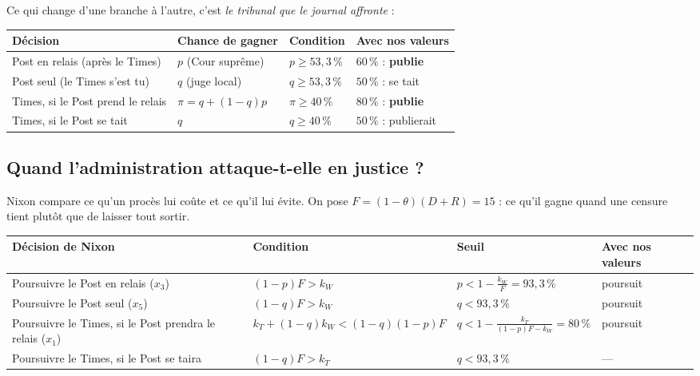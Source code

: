 \documentclass[11pt,a4paper]{article}
\theoremstyle{definition}
\newcommand{\T}[1]{\textcolor{nyt}{#1}}
\newcommand{\W}[1]{\textcolor{wp}{#1}}
\begin{document}
Ce qui change d'une branche à l'autre, c'est \emph{le tribunal que le journal affronte} :
\begin{center}
\small
\begin{tabular}{@{}llll@{}}
\toprule
Décision & Chance de gagner & Condition & Avec nos valeurs \\
\midrule
\W{Post} en relais (après le Times) & $p$ (Cour suprême) & $p\ge53{,}3\,\%$ & $60\,\%$ : \textbf{publie} \\
\W{Post} seul (le Times s'est tu) & $q$ (juge local) & $q\ge53{,}3\,\%$ & $50\,\%$ : se tait \\
\T{Times}, si le Post prend le relais & $\pi=q+(1-q)p$ & $\pi\ge40\,\%$ & $80\,\%$ : \textbf{publie} \\
\T{Times}, si le Post se tait & $q$ & $q\ge40\,\%$ & $50\,\%$ : publierait \\
\bottomrule
\end{tabular}
\end{center}

\subsection{Quand l'administration attaque-t-elle en justice ?}
Nixon compare ce qu'un procès lui coûte et ce qu'il lui évite. On pose $F=(1-\theta)(D+R)=15$ : ce qu'il gagne quand une censure tient plutôt que de laisser tout sortir.
\begin{center}
\small
\begin{tabularx}{\textwidth}{@{}>{\raggedright\arraybackslash}p{3.6cm}>{\raggedright\arraybackslash}Xll@{}}
\toprule
Décision de Nixon & Condition & Seuil & Avec nos valeurs \\
\midrule
Poursuivre le Post en relais ($x_3$) & $(1-p)F>k_W$ & $p<1-\frac{k_W}{F}=93{,}3\,\%$ & poursuit \\
Poursuivre le Post seul ($x_5$) & $(1-q)F>k_W$ & $q<93{,}3\,\%$ & poursuit \\
Poursuivre le Times, si le Post prendra le relais ($x_1$) & $k_T+(1-q)k_W<(1-q)(1-p)F$ & $q<1-\frac{k_T}{(1-p)F-k_W}=80\,\%$ & poursuit \\
Poursuivre le Times, si le Post se taira & $(1-q)F>k_T$ & $q<93{,}3\,\%$ & --- \\
\bottomrule
\end{tabularx}
\end{center}
\end{document}

